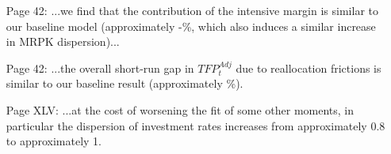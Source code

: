 \documentclass[12pt]{article}
\begin{document}
\begin{itemize}
	\item [Page 42:] ...we find that the contribution of the intensive margin is similar to our baseline model (approximately -\TFPdNoEtaKpr\%, which also induces a similar increase in MRPK dispersion)...
	\item [Page 42:] ...the overall short-run gap in $TFP_t^{Adj}$ due to reallocation frictions is similar to our baseline result (approximately \effgapNoEta\%).
	\item [Page XLV:] ...at the cost of worsening the fit of some other moments, in particular the dispersion of investment rates increases from approximately 0.8 to approximately 1.
\end{itemize}
\end{document}
